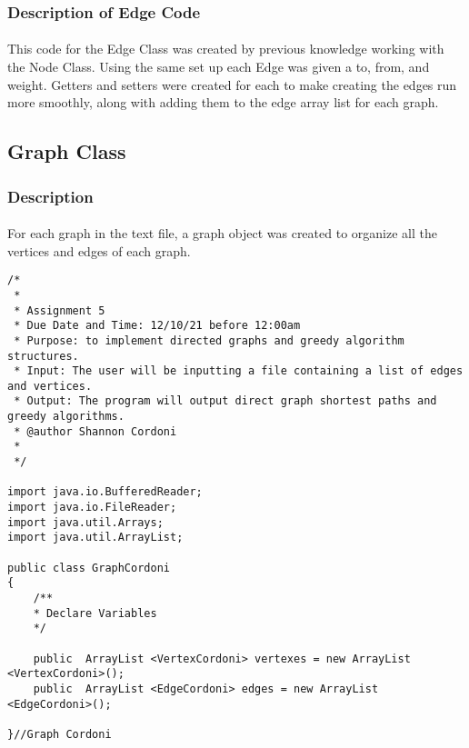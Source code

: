 \documentclass[letterpaper, 10pt,DIV=13]{scrartcl}
\numberwithin{equation}{section} %
\numberwithin{figure}{section} %
\numberwithin{table}{section} %
\begin{document}
\subsubsection{Description of Edge Code}
\paragraph{} This code for the Edge Class was created by previous knowledge working with the Node Class. Using the same set up each Edge was given a to, from, and weight. Getters and setters were created for each to make creating the edges run more smoothly, along with adding them to the edge array list for each graph. 

\subsection{Graph Class}

\subsubsection{Description}
\paragraph{} For each graph in the text file, a graph object was created to organize all the vertices and edges of each graph.

\lstset{numbers=left, numberstyle=\tiny, stepnumber=1, numbersep=5pt, basicstyle=\footnotesize\ttfamily}
\begin{lstlisting}[frame=single, ]
/*
 * 
 * Assignment 5
 * Due Date and Time: 12/10/21 before 12:00am 
 * Purpose: to implement directed graphs and greedy algorithm structures.
 * Input: The user will be inputting a file containing a list of edges and vertices. 
 * Output: The program will output direct graph shortest paths and greedy algorithms. 
 * @author Shannon Cordoni 
 * 
 */

import java.io.BufferedReader;
import java.io.FileReader;
import java.util.Arrays;
import java.util.ArrayList;

public class GraphCordoni
{
    /**
    * Declare Variables 
    */

    public  ArrayList <VertexCordoni> vertexes = new ArrayList <VertexCordoni>();
    public  ArrayList <EdgeCordoni> edges = new ArrayList <EdgeCordoni>();

}//Graph Cordoni
\end{lstlisting}
\end{document}

